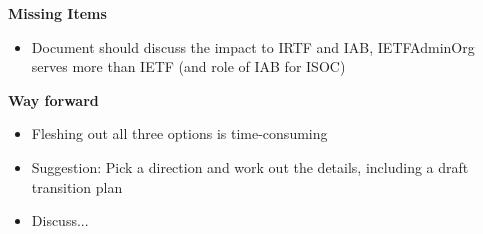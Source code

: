 \documentclass[helvetica,a4paper,landscape]{seminar}
\newcommand{\heading}[1]{%
  \begin{center} 
    \large\bf 
    #1 
  \end{center} 
  \vspace{.4 in}}
\begin{document}

\begin{slide}
\heading{Missing Items}
\begin{itemize}
\item Document should discuss the impact to IRTF and IAB, IETFAdminOrg serves more than IETF (and role of IAB for ISOC)
\end{itemize}
\end{slide}


\begin{slide}

\heading{Way forward}

\begin{itemize}
\item Fleshing out all three options is time-consuming
\item Suggestion: Pick a direction and work out the details, including a draft transition plan
\item Discuss...
\end{itemize}

\end{slide}
\end{document}
